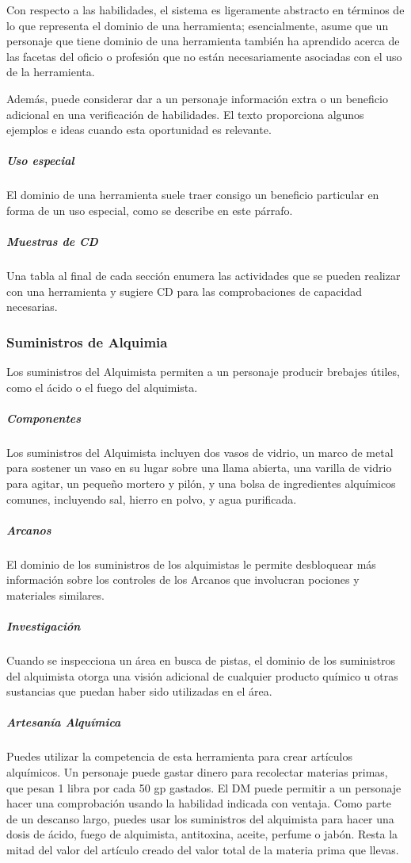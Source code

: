 \documentclass[a4paper,twocolumn,openany,10pt]{dndbook}
\begin{document}
Con respecto a las habilidades, el sistema es ligeramente abstracto en términos de lo que representa el dominio de una
herramienta; esencialmente, asume que un personaje que tiene dominio de una herramienta también ha aprendido acerca de las
facetas del oficio o profesión que no están necesariamente asociadas con el uso de la herramienta.

Además, puede considerar dar a un personaje información extra o un beneficio adicional en una verificación de habilidades. El
texto proporciona algunos ejemplos e ideas cuando esta oportunidad es relevante.

\subparagraph{Uso especial} El dominio de una herramienta suele traer consigo un beneficio particular en forma de un uso especial,
como se describe en este párrafo.

\subparagraph{Muestras de CD} Una tabla al final de cada sección enumera las actividades que se pueden realizar con una
herramienta y sugiere CD para las comprobaciones de capacidad necesarias. 

\subsubsection*{Suministros de Alquimia}
Los suministros del Alquimista permiten a un personaje producir brebajes útiles, como el ácido o el fuego del alquimista.

\subparagraph{Componentes} Los suministros del Alquimista incluyen dos vasos de vidrio, un marco de metal para sostener un vaso en
su lugar sobre una llama abierta, una varilla de vidrio para agitar, un pequeño mortero y pilón, y una bolsa de ingredientes
alquímicos comunes, incluyendo sal, hierro en polvo, y agua purificada.

\subparagraph{Arcanos} El dominio de los suministros de los alquimistas le permite desbloquear más información sobre los controles
de los Arcanos que involucran pociones y materiales similares.

\subparagraph{Investigación} Cuando se inspecciona un área en busca de pistas, el dominio de los suministros del alquimista otorga
una visión adicional de cualquier producto químico u otras sustancias que puedan haber sido utilizadas en el área.

\subparagraph{Artesanía Alquímica} Puedes utilizar la competencia de esta herramienta para crear artículos alquímicos. Un
personaje puede gastar dinero para recolectar materias primas, que pesan 1 libra por cada 50 gp gastados. El DM puede permitir a
un personaje hacer una comprobación usando la habilidad indicada con ventaja. Como parte de un descanso largo, puedes usar los
suministros del alquimista para hacer una dosis de ácido, fuego de alquimista, antitoxina, aceite, perfume o jabón. Resta la
mitad del valor del artículo creado del valor total de la materia prima que llevas.
\end{document}
